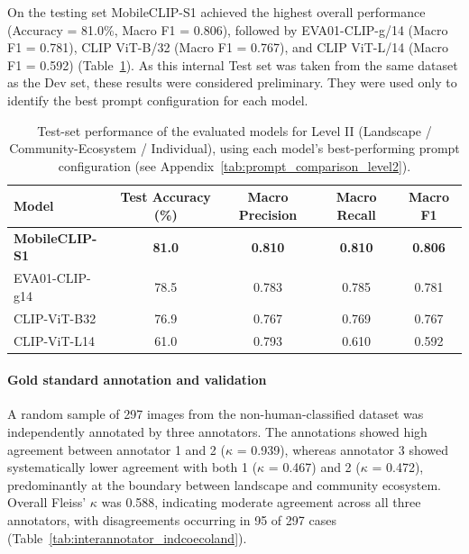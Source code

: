 \documentclass[11pt]{article}
\renewcommand{\_}{\textunderscore\allowbreak{}}
\begin{document}
On the testing set MobileCLIP-S1 achieved the highest overall performance (Accuracy = 81.0\%, Macro F1 = 0.806), followed by EVA01-CLIP-g/14 (Macro F1 = 0.781), CLIP ViT-B/32 (Macro F1 = 0.767), and CLIP ViT-L/14 (Macro F1 = 0.592) (Table~\ref{tab:level2_final_comparison}). As this internal Test set was taken from the same dataset as the Dev set, these results were considered preliminary. They were used only to identify the best prompt configuration for each model. 

\begin{table}[htbp]
\centering\small
\caption{Test-set performance of the evaluated models for Level II (Landscape / Community-Ecosystem / Individual), using each model's best-performing prompt configuration (see Appendix~\ref{tab:prompt_comparison_level2}).}
\label{tab:level2_final_comparison}
\begin{tabular}{@{}lcccc@{}}
\toprule
\textbf{Model} & \textbf{Test Accuracy (\%)} & \textbf{Macro Precision} & \textbf{Macro Recall} & \textbf{Macro F1} \\
\midrule
\textbf{MobileCLIP-S1} & \textbf{81.0} & \textbf{0.810} & \textbf{0.810} & \textbf{0.806} \\
EVA01-CLIP-g14              & 78.5 & 0.783 & 0.785 & 0.781 \\
CLIP-ViT-B32                & 76.9 & 0.767 & 0.769 & 0.767 \\
CLIP-ViT-L14                & 61.0 & 0.793 & 0.610 & 0.592 \\
\bottomrule
\end{tabular}
\end{table}

\paragraph{Gold standard annotation and validation}
A random sample of 297 images from the non-human-classified dataset was independently annotated by three annotators. The annotations showed high agreement between annotator 1 and 2 ($\kappa$ = 0.939), whereas annotator 3 showed systematically lower agreement with both 1 ($\kappa$ = 0.467) and 2 ($\kappa$ = 0.472), predominantly at the boundary between landscape and community ecosystem. Overall Fleiss' $\kappa$ was 0.588, indicating moderate agreement across all three annotators, with disagreements occurring in 95 of 297 cases (Table~\ref{tab:interannotator_indcoecoland}).
\end{document}
